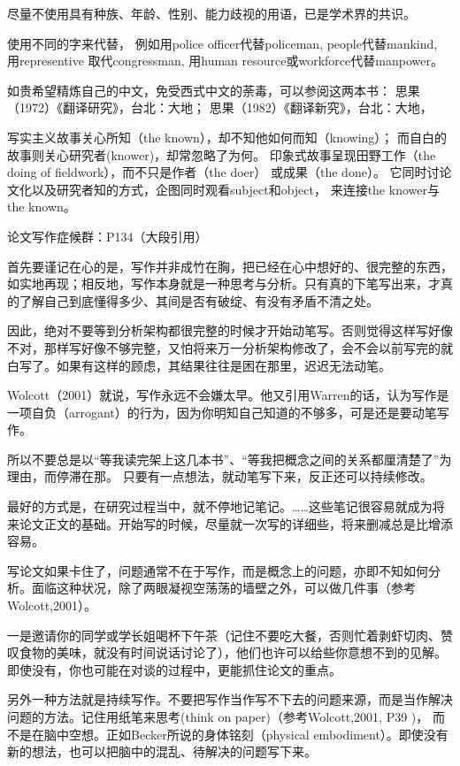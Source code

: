 尽量不使用具有种族、年龄、性别、能力歧视的用语，已是学术界的共识。

使用不同的字来代替， 例如用police officer代替policeman,  
people代替mankind, 用representive 取代congressman,
用human resource或workforce代替manpower。

如贵希望精炼自己的中文，免受西式中文的荼毒，可以参阅这两本书： 思果（1972）《翻译研究》，台北：大地；
思果（1982）《翻译新究》，台北：大地，


写实主义故事关心所知（the known），却不知他如何而知（knowing）；
而自白的故事则关心研究者(knower)，却常忽略了为何。
印象式故事呈现田野工作（the doing of fieldwork），而不只是作者（the doer）
或成果（the done）。
它同时讨论文化以及研究者知的方式，企图同时观看subject和object，
来连接the knower与the known。

论文写作症候群：P134（大段引用）

首先要谨记在心的是，写作并非成竹在胸，把已经在心中想好的、很完整的东西，如实地再现；相反地，写作本身就是一种思考与分析。只有真的下笔写出来，才真的了解自己到底懂得多少、其间是否有破绽、有没有矛盾不清之处。

因此，绝对不要等到分析架构都很完整的时候才开始动笔写。否则觉得这样写好像不对，那样写好像不够完整，又怕将来万一分析架构修改了，会不会以前写完的就白写了。如果有这样的顾虑，其结果往往是困在那里，迟迟无法动笔。

Wolcott（2001）就说，写作永远不会嫌太早。他又引用Warren的话，认为写作是一项自负（arrogant）的行为，因为你明知自己知道的不够多，可是还是要动笔写作。

所以不要总是以“等我读完架上这几本书”、“等我把概念之间的关系都厘清楚了”为理由，而停滞在那。
只要有一点想法，就动笔写下来，反正还可以持续修改。

最好的方式是，在研究过程当中，就不停地记笔记。……这些笔记很容易就成为将来论文正文的基础。开始写的时候，尽量就一次写的详细些，将来删减总是比增添容易。

写论文如果卡住了，问题通常不在于写作，而是概念上的问题，亦即不知如何分析。面临这种状况，除了两眼凝视空荡荡的墙壁之外，可以做几件事（参考Wolcott,2001）。

一是邀请你的同学或学长姐喝杯下午茶（记住不要吃大餐，否则忙着剥虾切肉、赞叹食物的美味，就没有时间说话讨论了），他们也许可以给些你意想不到的见解。即使没有，你也可能在对谈的过程中，更能抓住论文的重点。

另外一种方法就是持续写作。不要把写作当作写不下去的问题来源，而是当作解决问题的方法。记住用纸笔来思考(think on paper)（参考Wolcott,2001, P39 )， 而不是在脑中空想。正如Becker所说的身体铭刻（physical embodiment）。即使没有新的想法，也可以把脑中的混乱、待解决的问题写下来。

